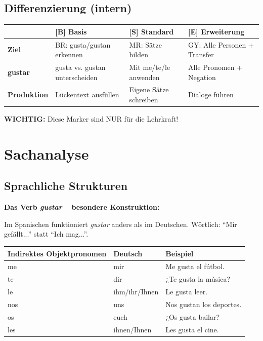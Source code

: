 \documentclass[11pt,a4paper]{article}
\newcommand{\B}{\textcolor{basis}{\textbf{[B]}}}
\newcommand{\Std}{\textcolor{standard}{\textbf{[S]}}}
\newcommand{\E}{\textcolor{erweiterung}{\textbf{[E]}}}
\begin{document}
\subsection{Differenzierung (intern)}
\begin{tabular}{|l|p{3.5cm}|p{3.5cm}|p{3.5cm}|}
\hline
& \B{} \textbf{Basis} & \Std{} \textbf{Standard} & \E{} \textbf{Erweiterung} \\
\hline
\textbf{Ziel} & BR: gusta/gustan erkennen & MR: Sätze bilden & GY: Alle Personen + Transfer \\
\hline
\textbf{gustar} & gusta vs. gustan unterscheiden & Mit me/te/le anwenden & Alle Pronomen + Negation \\
\hline
\textbf{Produktion} & Lückentext ausfüllen & Eigene Sätze schreiben & Dialoge führen \\
\hline
\end{tabular}

\vspace{0.5em}
\textbf{WICHTIG:} Diese Marker sind NUR für die Lehrkraft!

\section{Sachanalyse}

\subsection{Sprachliche Strukturen}

\textbf{Das Verb \textit{gustar} -- besondere Konstruktion:}

Im Spanischen funktioniert \textit{gustar} anders als im Deutschen. Wörtlich: ``Mir gefällt...'' statt ``Ich mag...''.

\begin{center}
\begin{tabular}{|l|l|l|}
\hline
\textbf{Indirektes Objektpronomen} & \textbf{Deutsch} & \textbf{Beispiel} \\
\hline
me & mir & Me gusta el fútbol. \\
te & dir & ¿Te gusta la música? \\
le & ihm/ihr/Ihnen & Le gusta leer. \\
nos & uns & Nos gustan los deportes. \\
os & euch & ¿Os gusta bailar? \\
les & ihnen/Ihnen & Les gusta el cine. \\
\hline
\end{tabular}
\end{center}
\end{document}
